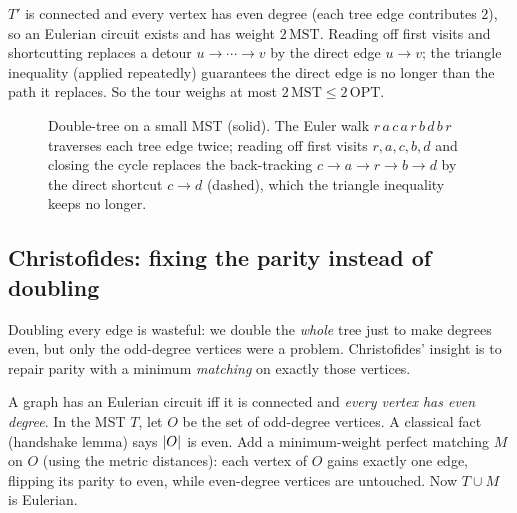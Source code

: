 \begin{whybox}
$T'$ is connected and every vertex has even degree (each tree edge contributes $2$), so an Eulerian
circuit exists and has weight $2\,\mathrm{MST}$. Reading off first visits and shortcutting replaces a
detour $u\to\cdots\to v$ by the direct edge $u\to v$; the triangle inequality (applied repeatedly)
guarantees the direct edge is no longer than the path it replaces. So the tour weighs at most
$2\,\mathrm{MST}\le 2\,\mathrm{OPT}$.
\end{whybox}

\begin{figure}[H]
\centering
{}
\caption{Double-tree on a small MST (solid). The Euler walk
$r\,a\,c\,a\,r\,b\,d\,b\,r$ traverses each tree edge twice; reading off first
visits $r,a,c,b,d$ and closing the cycle replaces the back-tracking
$c\to a\to r\to b\to d$ by the direct shortcut $c\to d$ (dashed), which the
triangle inequality keeps no longer.}
\label{ch38:fig-doubletree}
\end{figure}

\subsection{Christofides: fixing the parity instead of doubling}

Doubling every edge is wasteful: we double the \emph{whole} tree just to make degrees even, but only
the odd-degree vertices were a problem. Christofides' insight is to repair parity with a minimum
\emph{matching} on exactly those vertices.

\begin{focusbox}
A graph has an Eulerian circuit iff it is connected and \emph{every vertex has even degree}. In the
MST $T$, let $O$ be the set of odd-degree vertices. A classical fact (handshake lemma) says $\lvert O\rvert$
is even. Add a minimum-weight perfect matching $M$ on $O$ (using the metric distances): each vertex
of $O$ gains exactly one edge, flipping its parity to even, while even-degree vertices are untouched.
Now $T\cup M$ is Eulerian.
\end{focusbox}


